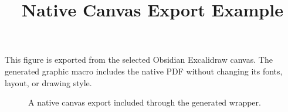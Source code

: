 \documentclass{article}
\title{Native Canvas Export Example}
\author{}
\date{}
\begin{document}
\maketitle

This figure is exported from the selected Obsidian Excalidraw canvas.
The generated graphic macro includes the native PDF without changing its
fonts, layout, or drawing style.

\begin{figure}[htbp]
  \centering
  \ExampleGraphic
  \caption{A native canvas export included through the generated wrapper.}
  \label{fig:example}
\end{figure}
\end{document}
